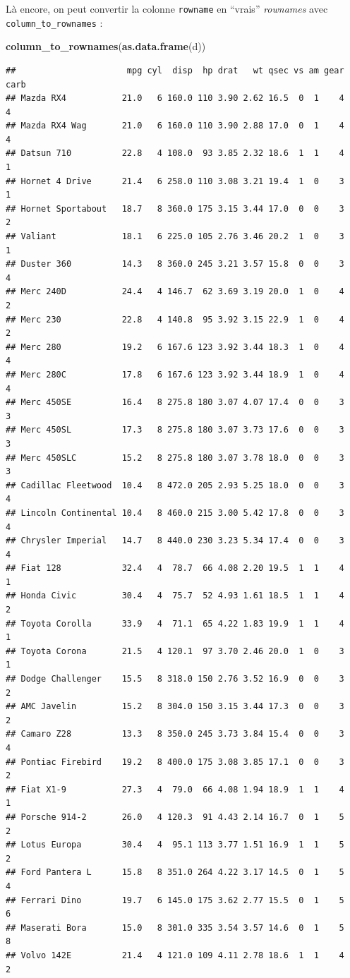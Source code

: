 \documentclass[]{book}
\newenvironment{Shaded}{\begin{snugshade}}{\end{snugshade}}
\newcommand{\KeywordTok}[1]{\textcolor[rgb]{0.13,0.29,0.53}{\textbf{#1}}}
\newcommand{\NormalTok}[1]{#1}
\begin{document}
Là encore, on peut convertir la colonne \texttt{rowname} en ``vrais''
\emph{rownames} avec \texttt{column\_to\_rownames} :

\begin{Shaded}
\begin{Highlighting}[]
\KeywordTok{column_to_rownames}\NormalTok{(}\KeywordTok{as.data.frame}\NormalTok{(d))}
\end{Highlighting}
\end{Shaded}

\begin{verbatim}
##                      mpg cyl  disp  hp drat   wt qsec vs am gear carb
## Mazda RX4           21.0   6 160.0 110 3.90 2.62 16.5  0  1    4    4
## Mazda RX4 Wag       21.0   6 160.0 110 3.90 2.88 17.0  0  1    4    4
## Datsun 710          22.8   4 108.0  93 3.85 2.32 18.6  1  1    4    1
## Hornet 4 Drive      21.4   6 258.0 110 3.08 3.21 19.4  1  0    3    1
## Hornet Sportabout   18.7   8 360.0 175 3.15 3.44 17.0  0  0    3    2
## Valiant             18.1   6 225.0 105 2.76 3.46 20.2  1  0    3    1
## Duster 360          14.3   8 360.0 245 3.21 3.57 15.8  0  0    3    4
## Merc 240D           24.4   4 146.7  62 3.69 3.19 20.0  1  0    4    2
## Merc 230            22.8   4 140.8  95 3.92 3.15 22.9  1  0    4    2
## Merc 280            19.2   6 167.6 123 3.92 3.44 18.3  1  0    4    4
## Merc 280C           17.8   6 167.6 123 3.92 3.44 18.9  1  0    4    4
## Merc 450SE          16.4   8 275.8 180 3.07 4.07 17.4  0  0    3    3
## Merc 450SL          17.3   8 275.8 180 3.07 3.73 17.6  0  0    3    3
## Merc 450SLC         15.2   8 275.8 180 3.07 3.78 18.0  0  0    3    3
## Cadillac Fleetwood  10.4   8 472.0 205 2.93 5.25 18.0  0  0    3    4
## Lincoln Continental 10.4   8 460.0 215 3.00 5.42 17.8  0  0    3    4
## Chrysler Imperial   14.7   8 440.0 230 3.23 5.34 17.4  0  0    3    4
## Fiat 128            32.4   4  78.7  66 4.08 2.20 19.5  1  1    4    1
## Honda Civic         30.4   4  75.7  52 4.93 1.61 18.5  1  1    4    2
## Toyota Corolla      33.9   4  71.1  65 4.22 1.83 19.9  1  1    4    1
## Toyota Corona       21.5   4 120.1  97 3.70 2.46 20.0  1  0    3    1
## Dodge Challenger    15.5   8 318.0 150 2.76 3.52 16.9  0  0    3    2
## AMC Javelin         15.2   8 304.0 150 3.15 3.44 17.3  0  0    3    2
## Camaro Z28          13.3   8 350.0 245 3.73 3.84 15.4  0  0    3    4
## Pontiac Firebird    19.2   8 400.0 175 3.08 3.85 17.1  0  0    3    2
## Fiat X1-9           27.3   4  79.0  66 4.08 1.94 18.9  1  1    4    1
## Porsche 914-2       26.0   4 120.3  91 4.43 2.14 16.7  0  1    5    2
## Lotus Europa        30.4   4  95.1 113 3.77 1.51 16.9  1  1    5    2
## Ford Pantera L      15.8   8 351.0 264 4.22 3.17 14.5  0  1    5    4
## Ferrari Dino        19.7   6 145.0 175 3.62 2.77 15.5  0  1    5    6
## Maserati Bora       15.0   8 301.0 335 3.54 3.57 14.6  0  1    5    8
## Volvo 142E          21.4   4 121.0 109 4.11 2.78 18.6  1  1    4    2
\end{verbatim}
\end{document}
